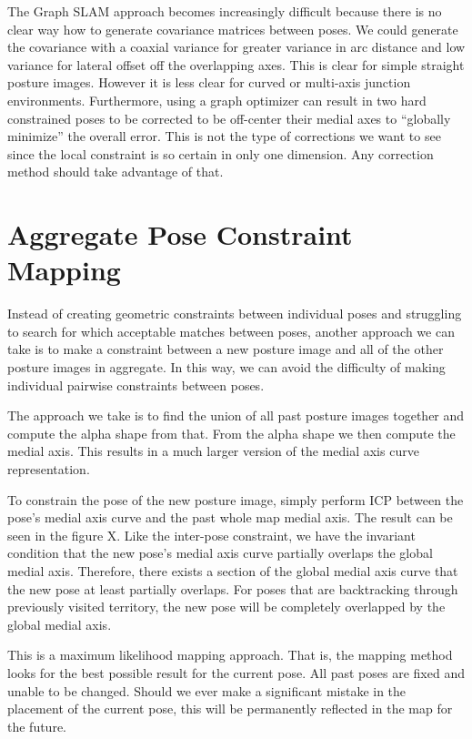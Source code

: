 The Graph SLAM approach becomes increasingly difficult because there is no clear way how to generate covariance matrices between poses. We could generate the covariance with a coaxial variance for greater variance in arc distance and low variance for lateral offset off the overlapping axes. This is clear for simple straight posture images. However it is less clear for curved or multi-axis junction environments. Furthermore, using a graph optimizer can result in two hard constrained poses to be corrected to be off-center their medial axes to “globally minimize” the overall error. This is not the type of corrections we want to see since the local constraint is so certain in only one dimension. Any correction method should take advantage of that.

\section{Aggregate Pose Constraint Mapping}
\label{aggregateposeconstraintmapping}

Instead of creating geometric constraints between individual poses and struggling to search for which acceptable matches between poses, another approach we can take is to make a constraint between a new posture image and all of the other posture images in aggregate. In this way, we can avoid the difficulty of making individual pairwise constraints between poses.

The approach we take is to find the union of all past posture images together and compute the alpha shape from that. From the alpha shape we then compute the medial axis. This results in a much larger version of the medial axis curve representation.

To constrain the pose of the new posture image, simply perform ICP between the pose’s medial axis curve and the past whole map medial axis. The result can be seen in the figure X. Like the inter-pose constraint, we have the invariant condition that the new pose’s medial axis curve partially overlaps the global medial axis. Therefore, there exists a section of the global medial axis curve that the new pose at least partially overlaps. For poses that are backtracking through previously visited territory, the new pose will be completely overlapped by the global medial axis.

This is a maximum likelihood mapping approach. That is, the mapping method looks for the best possible result for the current pose. All past poses are fixed and unable to be changed. Should we ever make a significant mistake in the placement of the current pose, this will be permanently reflected in the map for the future.

